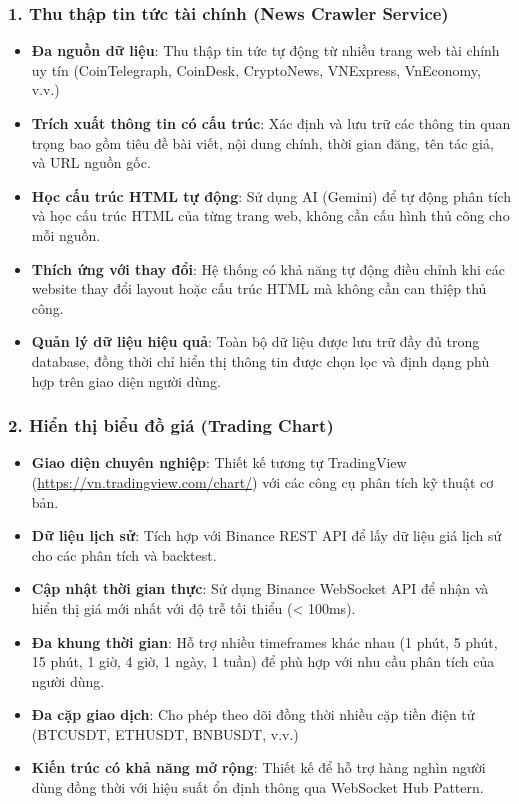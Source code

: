 \subsubsection*{1. Thu thập tin tức tài chính (News Crawler Service)}
\begin{itemize}
    \item \textbf{Đa nguồn dữ liệu}: Thu thập tin tức tự động từ nhiều trang web tài chính uy tín (CoinTelegraph, CoinDesk, CryptoNews, VNExpress, VnEconomy, v.v.)
    
    \item \textbf{Trích xuất thông tin có cấu trúc}: Xác định và lưu trữ các thông tin quan trọng bao gồm tiêu đề bài viết, nội dung chính, thời gian đăng, tên tác giả, và URL nguồn gốc.
    
    \item \textbf{Học cấu trúc HTML tự động}: Sử dụng AI (Gemini) để tự động phân tích và học cấu trúc HTML của từng trang web, không cần cấu hình thủ công cho mỗi nguồn.
    
    \item \textbf{Thích ứng với thay đổi}: Hệ thống có khả năng tự động điều chỉnh khi các website thay đổi layout hoặc cấu trúc HTML mà không cần can thiệp thủ công.
    
    \item \textbf{Quản lý dữ liệu hiệu quả}: Toàn bộ dữ liệu được lưu trữ đầy đủ trong database, đồng thời chỉ hiển thị thông tin được chọn lọc và định dạng phù hợp trên giao diện người dùng.
\end{itemize}

\subsubsection*{2. Hiển thị biểu đồ giá (Trading Chart)}
\begin{itemize}
    \item \textbf{Giao diện chuyên nghiệp}: Thiết kế tương tự TradingView (\url{https://vn.tradingview.com/chart/}) với các công cụ phân tích kỹ thuật cơ bản.
    
    \item \textbf{Dữ liệu lịch sử}: Tích hợp với Binance REST API để lấy dữ liệu giá lịch sử cho các phân tích và backtest.
    
    \item \textbf{Cập nhật thời gian thực}: Sử dụng Binance WebSocket API để nhận và hiển thị giá mới nhất với độ trễ tối thiểu (< 100ms).
    
    \item \textbf{Đa khung thời gian}: Hỗ trợ nhiều timeframes khác nhau (1 phút, 5 phút, 15 phút, 1 giờ, 4 giờ, 1 ngày, 1 tuần) để phù hợp với nhu cầu phân tích của người dùng.
    
    \item \textbf{Đa cặp giao dịch}: Cho phép theo dõi đồng thời nhiều cặp tiền điện tử (BTCUSDT, ETHUSDT, BNBUSDT, v.v.)
    
    \item \textbf{Kiến trúc có khả năng mở rộng}: Thiết kế để hỗ trợ hàng nghìn người dùng đồng thời với hiệu suất ổn định thông qua WebSocket Hub Pattern.
\end{itemize}

